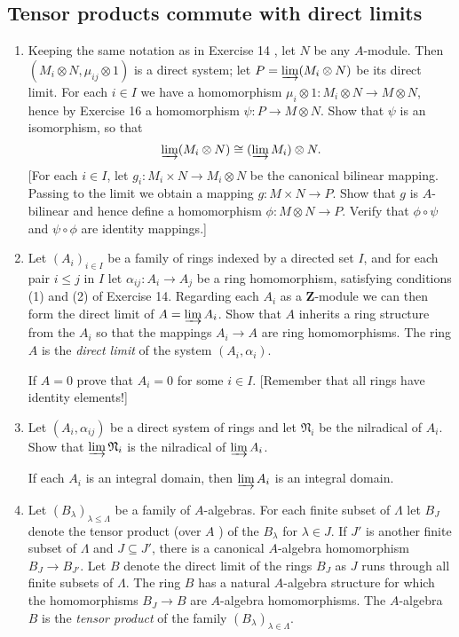 \documentclass{standalone}
\theoremstyle{definition}
\theoremstyle{remark}
\begin{document}
\subsection*{Tensor products commute with direct limits}
\begin{enumerate}[resume*=exc2]
  \item Keeping the same notation as in Exercise 14 , let $N$ be any $A$-module.
        Then $(M_{i} \otimes N, \mu_{i j} \otimes 1)$ is a direct
        system; let $P=\varinjlim(M_{i} \otimes N)$ be its
        direct limit. For each $i \in I$ we have a homomorphism
        $\mu_{i} \otimes 1\colon M_{i} \otimes N \to M \otimes N$, hence by Exercise
        16 a homomorphism $\psi\colon P \to M \otimes N$. Show that $\psi$ is an
        isomorphism, so that
\[
  \varinjlim(M_{i} \otimes N) \cong(\varinjlim M_{i}) \otimes N .
\]
[For each $i \in I$, let $g_{i}: M_{i} \times N \to M_{i} \otimes N$ be the
canonical bilinear mapping. Passing to the limit we obtain a mapping
$g: M \times N \to P$. Show that $g$ is $A$-bilinear and hence define a
homomorphism $\phi: M \otimes N \to P$. Verify that $\phi \circ \psi$ and
$\psi \circ \phi$ are identity mappings.]
  \item Let $(A_{i})_{i\in I}$ be a family of rings indexed by
        a directed set $I$, and for each pair $i \le j$ in $I$ let
        $\alpha_{i j}: A_{i} \to A_{j}$ be a ring homomorphism, satisfying
        conditions (1) and (2) of Exercise 14. Regarding each $A_{i}$ as a
        $\mathbf{Z}$-module we can then form the direct limit of
        $A=\varinjlim A_{i}$. Show that $A$ inherits a ring
        structure from the $A_{i}$ so that the mappings
        $A_{i} \to A$ are ring homomorphisms. The ring $A$ is
        the {\itshape direct limit} of the system $(A_{i},
        \alpha_{i})$.
        
If $A=0$ prove that $A_{i}=0$ for some $i \in I$. [Remember that all rings have
identity elements!]
  \item Let $(A_{i}, \alpha_{i j})$ be a direct system of rings and
        let $\mathfrak{N}_{i}$ be the nilradical of $A_{i}$. Show that
        $\varinjlim\mathfrak{N}_{i}$ is the nilradical
        of $\varinjlim A_{i}$.
        
If each $A_{i}$ is an integral domain, then
$\varinjlim A_{i}$ is an integral domain.
  \item Let $(B_{\lambda})_{\lambda \leq \Lambda}$ be a family of
        $A$-algebras. For each finite subset of $\Lambda$ let $B_{J}$ denote the
        tensor product (over $A$ ) of the $B_{\lambda}$ for $\lambda \in J$. If
        $J'$ is another finite subset of $\Lambda$ and $J \subseteq J'$, there
        is a canonical $A$-algebra homomorphism $B_{J} \to B_{J'}$. Let $B$
        denote the direct limit of the rings $B_{J}$ as $J$ runs through all
        finite subsets of $\Lambda$. The ring $B$ has a natural $A$-algebra
        structure for which the homomorphisms $B_{J} \to B$ are $A$-algebra
        homomorphisms. The $A$-algebra $B$ is the {\itshape tensor
          product} of the family $(B_{\lambda})_{\lambda \in
          \Lambda}$. 
\end{enumerate}
\end{document}
